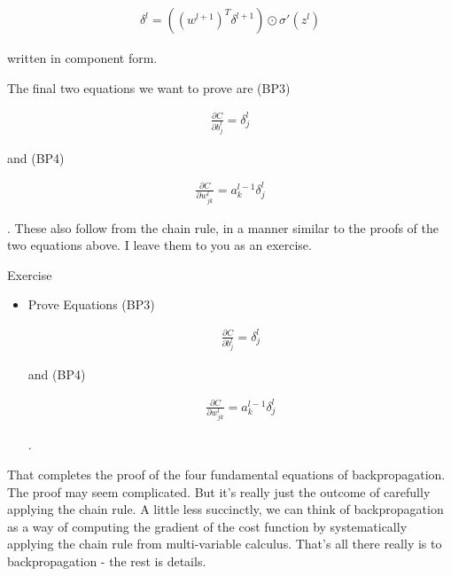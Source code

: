 \begin{align*}
\delta^l = ((w^{l+1})^T \delta^{l+1}) \odot \sigma'(z^l) \nonumber
\end{align*}

\noindent written in component form.


The final two equations we want to prove are (BP3)

\begin{align*}
\frac{\partial C}{\partial b^l_j} = \delta^l_j \nonumber
\end{align*}

\noindent and (BP4)

\begin{align*}
\frac{\partial C}{\partial w^l_{jk}} = a^{l-1}_k \delta^l_j \nonumber
\end{align*}

\noindent. These also follow from the chain rule, in a manner similar to the proofs of the two equations above. I leave them to you as an exercise.



\begin{exerciseBox}{Exercise}


\begin{itemize}

\item 
Prove Equations (BP3)


\begin{align*}
\frac{\partial C}{\partial b^l_j} = \delta^l_j \nonumber
\end{align*}

and (BP4)


\begin{align*}
\frac{\partial C}{\partial w^l_{jk}} = a^{l-1}_k \delta^l_j \nonumber
\end{align*}

.

\end{itemize}


That completes the proof of the four fundamental equations of backpropagation. The proof may seem complicated. But it's really just the outcome of carefully applying the chain rule. A little less succinctly, we can think of backpropagation as a way of computing the gradient of the cost function by systematically applying the chain rule from multi-variable calculus. That's all there really is to backpropagation - the rest is details.

\end{exerciseBox}



